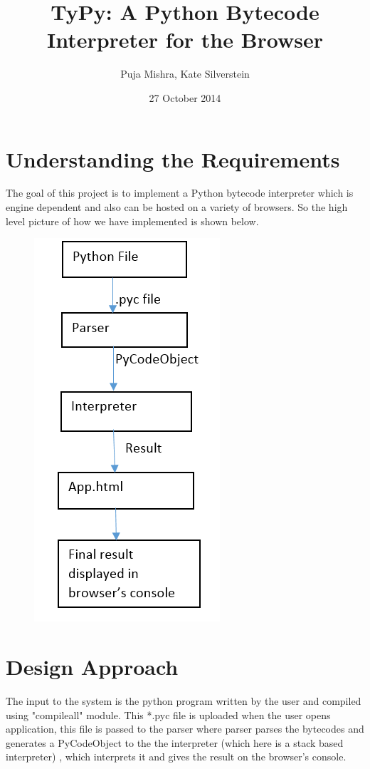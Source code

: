 \documentclass[10pt,a4paper]{article}
\title{TyPy: A Python Bytecode Interpreter for the Browser}
\author{Puja Mishra, Kate Silverstein}
\date{27 October 2014}
\begin{document}
\maketitle
\section{Understanding the Requirements}

The goal of this project is to implement a Python bytecode interpreter which is engine dependent and also can be hosted on a variety of browsers. So the high level picture of how we have implemented is shown below.

\begin{figure}[ht!]
\center
\includegraphics[scale=1]{../Report/UnderstandingTheReq.png} 

\end{figure}

\section{Design Approach}

The input to the system is the python program written by the user and compiled using "compileall" module. This *.pyc file is uploaded when the user opens application, this file is passed to the parser where parser parses the bytecodes and generates a PyCodeObject to the the interpreter (which here is a stack based interpreter) , which interprets it and gives the result on the browser's console.
\end{document}

